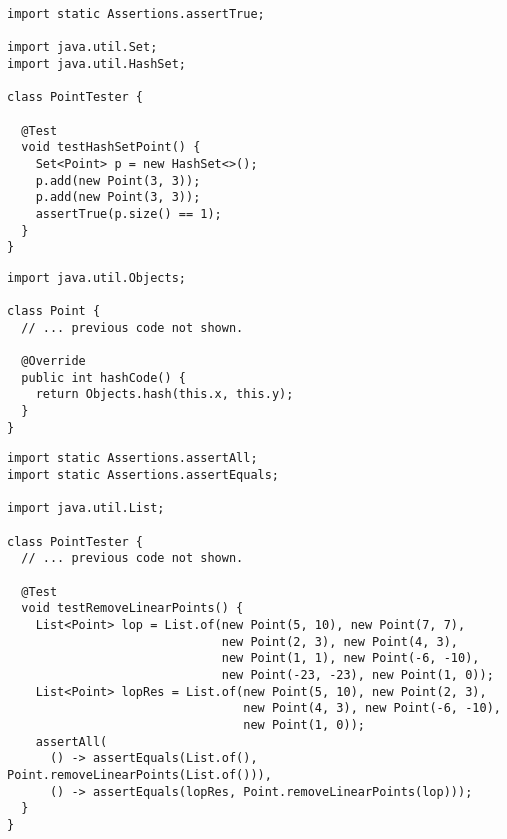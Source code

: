 \begin{lstlisting}[language=MyJava]
import static Assertions.assertTrue;

import java.util.Set;
import java.util.HashSet;

class PointTester {

  @Test
  void testHashSetPoint() {
    Set<Point> p = new HashSet<>();
    p.add(new Point(3, 3));
    p.add(new Point(3, 3));
    assertTrue(p.size() == 1);
  }
}
\end{lstlisting}

\begin{lstlisting}[language=MyJava]
import java.util.Objects;

class Point {
  // ... previous code not shown.

  @Override
  public int hashCode() {
    return Objects.hash(this.x, this.y);
  }
}
\end{lstlisting}


\begin{lstlisting}[language=MyJava]
import static Assertions.assertAll;
import static Assertions.assertEquals;

import java.util.List;

class PointTester {
  // ... previous code not shown. 

  @Test
  void testRemoveLinearPoints() {
    List<Point> lop = List.of(new Point(5, 10), new Point(7, 7),
                              new Point(2, 3), new Point(4, 3),
                              new Point(1, 1), new Point(-6, -10),
                              new Point(-23, -23), new Point(1, 0));
    List<Point> lopRes = List.of(new Point(5, 10), new Point(2, 3),
                                 new Point(4, 3), new Point(-6, -10),
                                 new Point(1, 0));
    assertAll(
      () -> assertEquals(List.of(), Point.removeLinearPoints(List.of())),
      () -> assertEquals(lopRes, Point.removeLinearPoints(lop)));
  }
}
\end{lstlisting}

